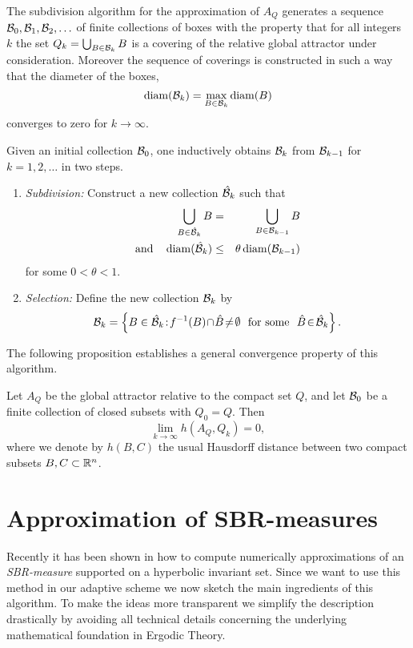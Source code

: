 \documentclass[cvs,envcountsect]{svjour}
\begin{document}
The subdivision algorithm for the approximation of $A_Q$
generates a sequence $\cB_0,\cB_1,\cB_2,\ldots$ of finite
collections of boxes with the property that for all
integers $k$ the set $Q_k=\bigcup_{B\in\cB_k}B$
is a covering of the relative global attractor under consideration.
Moreover the sequence of coverings
is constructed in such a way that the diameter of the boxes,
\[
\diam(\cB_k) = \max_{B\in\cB_k}\diam(B)
\]
converges to zero for $k\rightarrow\infty$.

Given an initial collection $\cB_0$, one inductively obtains $\cB_k$ from
$\cB_{k-1}$ for $k=1,2,\ldots$ in two steps.
\begin{enumerate}
\item {\em Subdivision:} Construct a new collection $\hat\cB_k$ such that
\begin{eqnarray*}
\bigcup_{B\in\hat\cB_k}B &=& \bigcup_{B\in\cB_{k-1}}B \\
\mbox{and}\quad
\diam(\hat\cB_k) &\leq& \theta\diam(\cB_{k-1})
\end{eqnarray*}
for some $0<\theta<1$.
\item {\em Selection:} Define the new collection $\cB_k$ by
\[
\cB_k=\left\{B\in\hat\cB_k \!:\! f^{-1}(B)\!\cap\!\hat B\!\ne\!\emptyset
\!\!\quad\mbox{for some}\!\!\quad\hat B\!\in\!\hat\cB_k\right\}.
\]
\end{enumerate}

The following proposition establishes a general convergence property of
this algorithm.

\begin{proposition}[\cite{DH1}]
\label{prop:sdconv}
Let $A_Q$ be the global attractor relative to the compact set $Q$,
and let $\cB_0$ be a finite collection of closed subsets with
$Q_0=Q$. Then
\[
\lim\limits_{k\rightarrow\infty}
h\left( A_Q, Q_k \right)=0,
\]
where we denote by $h(B,C)$ the usual Hausdorff distance between two
compact subsets $B,C\subset{\mathbb R}^n$.
\end{proposition}

\setcounter{equation}{0}
\section{Approximation of SBR-measures}
\label{sec:fp}
%
Recently it has been shown in \cite{DJ:96} how to compute numerically
approximations of an {\em SBR-measure\/} supported on a hyperbolic
invariant set.  Since we want to use this method in our adaptive scheme
we now sketch the main ingredients of this algorithm.
To make the ideas more transparent we simplify the description
drastically by avoiding all technical details
concerning the underlying mathematical foundation in Ergodic Theory.
\end{document}
